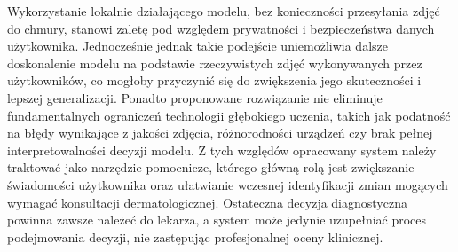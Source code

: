 Wykorzystanie lokalnie działającego modelu, bez konieczności przesyłania zdjęć do chmury, stanowi zaletę pod względem prywatności i bezpieczeństwa danych użytkownika.
Jednocześnie jednak takie podejście uniemożliwia dalsze doskonalenie modelu na podstawie rzeczywistych zdjęć wykonywanych przez użytkowników, co mogłoby przyczynić się do zwiększenia jego skuteczności i lepszej generalizacji.
Ponadto proponowane rozwiązanie nie eliminuje fundamentalnych ograniczeń technologii głębokiego uczenia, takich jak podatność na błędy wynikające z jakości zdjęcia, różnorodności urządzeń czy brak pełnej interpretowalności decyzji modelu.
Z tych względów opracowany system należy traktować jako narzędzie pomocnicze, którego główną rolą jest zwiększanie świadomości użytkownika oraz ułatwianie wczesnej identyfikacji zmian mogących wymagać konsultacji dermatologicznej.
Ostateczna decyzja diagnostyczna powinna zawsze należeć do lekarza, a system może jedynie uzupełniać proces podejmowania decyzji, nie zastępując profesjonalnej oceny klinicznej.